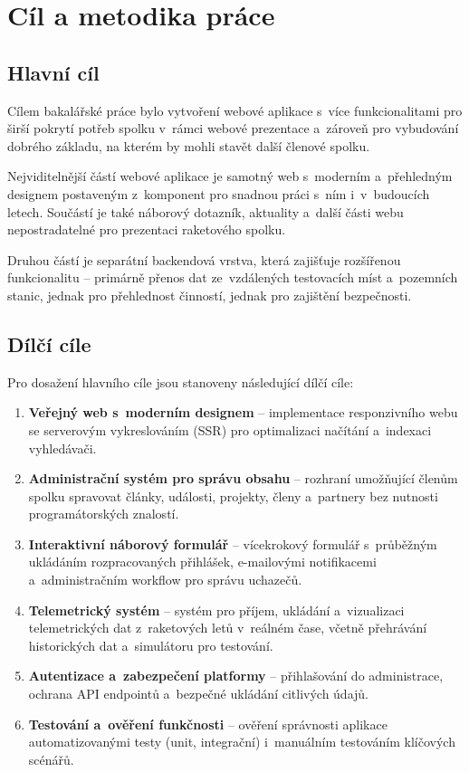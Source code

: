 \chapter{Cíl a metodika práce}

\section{Hlavní cíl}
Cílem bakalářské práce bylo vytvoření webové aplikace s~více funkcionalitami pro širší pokrytí potřeb spolku v~rámci webové prezentace a~zároveň pro vybudování dobrého základu, na kterém by mohli stavět další členové spolku.

Nejviditelnější částí webové aplikace je samotný web s~moderním a~přehledným designem postaveným z~komponent pro snadnou práci s~ním i~v~budoucích letech. Součástí je také náborový dotazník, aktuality a~další části webu nepostradatelné pro prezentaci raketového spolku.

Druhou částí je separátní backendová vrstva, která zajišťuje rozšířenou funkcionalitu -- primárně přenos dat ze~vzdálených testovacích míst a~pozemních stanic, jednak pro přehlednost činností, jednak pro zajištění bezpečnosti.

\section{Dílčí cíle}

Pro dosažení hlavního cíle jsou stanoveny následující dílčí cíle:

\begin{enumerate}
    \item \textbf{Veřejný web s~moderním designem} -- implementace responzivního webu se serverovým vykreslováním (SSR) pro optimalizaci načítání a~indexaci vyhledávači.
    \item \textbf{Administrační systém pro správu obsahu} -- rozhraní umožňující členům spolku spravovat články, události, projekty, členy a~partnery bez nutnosti programátorských znalostí.
    \item \textbf{Interaktivní náborový formulář} -- vícekrokový formulář s~průběžným ukládáním rozpracovaných přihlášek, e-mailovými notifikacemi a~administračním workflow pro správu uchazečů.
    \item \textbf{Telemetrický systém} -- systém pro příjem, ukládání a~vizualizaci telemetrických dat z~raketových letů v~reálném čase, včetně přehrávání historických dat a~simulátoru pro testování.
    \item \textbf{Autentizace a~zabezpečení platformy} -- přihlašování do administrace, ochrana API endpointů a~bezpečné ukládání citlivých údajů.
    \item \textbf{Testování a~ověření funkčnosti} -- ověření správnosti aplikace automatizovanými testy (unit, integrační) i~manuálním testováním klíčových scénářů.
\end{enumerate}


